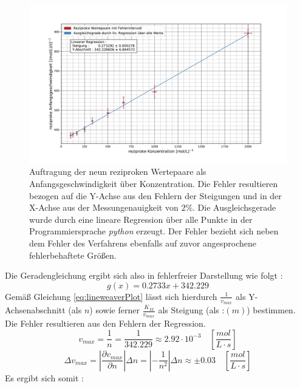 \begin{figure}[H]
	\centering	
	\begin{minipage}{1\textwidth}
		\includegraphics[width=\columnwidth]{Bilder/Lineweaver.pdf}
	\end{minipage}
	\caption{Auftragung der neun reziproken Wertepaare als Anfangsgeschwindigkeit über Konzentration. Die Fehler resultieren bezogen auf die Y-Achse aus den Fehlern der Steigungen und in der X-Achse aus der Messungenauigkeit von $2\%$. Die Ausgleichsgerade wurde durch eine lineare Regression über alle Punkte in der Programmiersprache \textit{python} erzeugt. Der Fehler bezieht sich neben dem Fehler des Verfahrens ebenfalls auf zuvor angesprochene fehlerbehaftete Größen.}
	\label{Lineweaver}
\end{figure}
Die Geradengleichung ergibt sich also in fehlerfreier Darstellung wie folgt : 
\begin{equation}
g(x) = 0.2733 x + 342.229
\label{Geradengleichung}
\end{equation}
Gemäß Gleichung \ref{eq:lineweaverPlot} lässt sich hierdurch $\frac{1}{v_{max}}$ als Y-Achsenabschnitt (als $n$) sowie ferner $\frac{K_M}{v_{max}}$ als Steigung (als :$(m)$) bestimmen. Die Fehler resultieren aus den Fehlern der Regression.\\
\begin{equation}
v_{max} = \frac{1}{n} = \frac{1}{342.229} \approx 2.92\cdot 10^{-3} \quad \left[\si{\frac{mol}{L\cdot s}}\right]
\end{equation}
\begin{equation}
\Delta v_{max} = |\frac{\partial v_{max}}{\partial n}|\Delta n = |-\frac{1}{n^2}|\Delta n \approx \pm 0.03  \quad \left[\si{\frac{mol}{L\cdot s}}\right]
\end{equation}
Es ergibt sich somit : 
